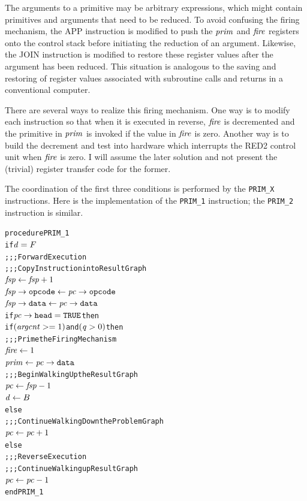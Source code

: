 The arguments to a primitive may be arbitrary expressions, which might contain primitives
and arguments that need to be reduced. To avoid confusing the firing mechanism, the APP
instruction is modified to push the \(\mathit{prim}\) and \(\mathit{fire}\) registers onto the control stack
before initiating the reduction of an argument. Likewise, the JOIN instruction is modified
to restore these register values after the argument has been reduced. This situation is
analogous to the saving and restoring of register values associated with subroutine calls
and returns in a conventional computer.

There are several ways to realize this firing mechanism. One way is to modify each
instruction so that when it is executed in reverse, \(\mathit{fire}\) is decremented and the
primitive in \(\mathit{prim}\) is invoked if the value in \(\mathit{fire}\) is zero. Another way is to build
the decrement and test into hardware which interrupts the RED2 control unit when \(\mathit{fire}\)
is zero. I will assume the later solution and not present the (trivial) register transfer
code for the former.


The coordination of the first three conditions is performed by the \texttt{PRIM\_X}
instructions. Here is the implementation of the \texttt{PRIM\_1} instruction; the \texttt{PRIM\_2}
instruction is similar.

\par\smallskip\noindent\begin{minipage}{\linewidth}
\begin{alltt}
procedure PRIM\_1
  if \(\rt{d} = F\)
    \textrm{;;; Forward Execution}
    \textrm{;;; Copy Instruction into Result Graph}
    \(\rt{fsp} \leftarrow \rt{fsp}+1\)
    \(\rtfield{fsp}{opcode} \leftarrow \rtfield{pc}{opcode}\)
    \(\rtfield{fsp}{data} \leftarrow \rtfield{pc}{data}\)
    if \(\rtfield{pc}{head} = \mathtt{TRUE}\) then
      if \((\rt{argcnt} >= 1)\) and \((\rt{q} > 0)\) then
        \textrm{;;; Prime the Firing Mechanism}
        \(\rt{fire} \leftarrow 1\)
        \(\rt{prim} \leftarrow \rtfield{pc}{data}\)
      \textrm{;;; Begin Walking Up the Result Graph}
      \(\rt{pc} \leftarrow \rt{fsp}-1\)
      \(\rt{d} \leftarrow B\)
    else
      \textrm{;;; Continue Walking Down the Problem Graph}
      \(\rt{pc} \leftarrow \rt{pc}+1\)
  else
    \textrm{;;; Reverse Execution}
    \textrm{;;; Continue Walking up Result Graph}
    \(\rt{pc} \leftarrow \rt{pc}-1\)
end PRIM\_1
\end{alltt}
\end{minipage}\par\smallskip


